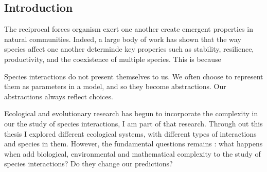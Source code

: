 \begin{refsection}
\chapter{Introduction} %
\label{Intro}

The reciprocal forces organism exert one another create emergent properties in natural communities. Indeed, a large body of work has shown that the way species affect one another determinde key properies such as stability, resilience, productivity, and the coexistence of multiple species. This is because

Species interactions do not present themselves to us. We often choose to represent them as parameters in a model, and so they become abstractions. Our abstractions always reflect choices.


Ecological and evolutionary research has begun to incorporate the complexity in our the study of species interactions, I am part of that research. Through out this thesis I explored different ecological systems, with different types of interactions and species in them. However, the fundamental questions remains : what happens when add biological, environmental and mathematical complexity to the study of species interactions? Do they change our predictions?

\end{refsection}
